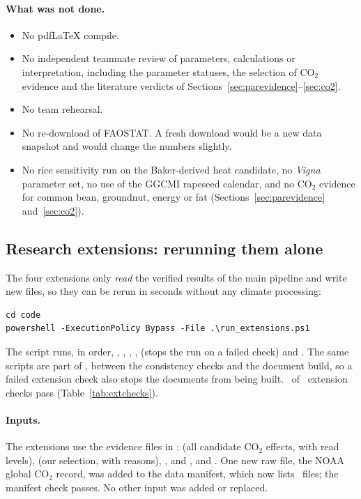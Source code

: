 \paragraph{What was not done.}
\begin{itemize}
\item No pdfLaTeX compile.
\item No independent teammate review of parameters, calculations or interpretation, including the parameter statuses,
the selection of CO$_2$ evidence and the literature verdicts of Sections~\ref{sec:parevidence}--\ref{sec:co2}.
\item No team rehearsal.
\item No re-download of FAOSTAT. A fresh download would be a new data snapshot and would change the numbers
slightly.
\item No rice sensitivity run on the Baker-derived heat candidate, no \emph{Vigna} parameter set, no use of the GGCMI
rapeseed calendar, and no CO$_2$ evidence for common bean, groundnut, energy or fat (Sections~\ref{sec:parevidence}
and~\ref{sec:co2}).
\end{itemize}

\subsection{Research extensions: rerunning them alone}\label{sec:reproext}
The four extensions only \emph{read} the verified results of the main pipeline and write new files, so they can be
rerun in seconds without any climate processing:
\begin{verbatim}
cd code
powershell -ExecutionPolicy Bypass -File .\run_extensions.ps1
\end{verbatim}
The script runs, in order, , ,
, ,  (stops the run on a
failed check) and . The same scripts are part of , between the
consistency checks and the document build, so a failed extension check also stops the documents from being built.
\extChecksPassed\ of \extChecksN\ extension checks pass (Table~\ref{tab:extchecks}).

\paragraph{Inputs.} The extensions use the evidence files in :  (all
candidate CO$_2$ effects, with read levels),  (our selection, with reasons),
,  and ,
and . One new raw file, the NOAA global CO$_2$ record, was added to the data
manifest, which now lists \manifestFiles\ files; the manifest check passes. No other input was added or replaced.

